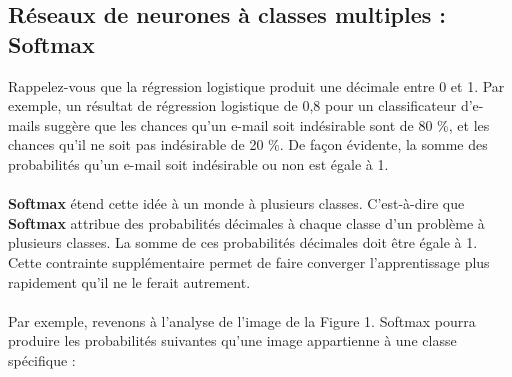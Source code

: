\documentclass[french]{article}
\begin{document}
\subsection{Réseaux de neurones à classes multiples : Softmax}
Rappelez-vous que la régression logistique produit une décimale entre 0 et 1. Par exemple, un résultat de régression logistique de 0,8 pour un classificateur d'e-mails suggère que les chances qu'un e-mail soit indésirable sont de 80 \%, et les chances qu'il ne soit pas indésirable de 20 \%. De façon évidente, la somme des probabilités qu'un e-mail soit indésirable ou non est égale à 1.\\\\
\textbf{Softmax} étend cette idée à un monde à plusieurs classes. C'est-à-dire que \textbf{Softmax} attribue des probabilités décimales à chaque classe d'un problème à plusieurs classes. La somme de ces probabilités décimales doit être égale à 1. Cette contrainte supplémentaire permet de faire converger l'apprentissage plus rapidement qu'il ne le ferait autrement.\\\\
Par exemple, revenons à l'analyse de l'image de la Figure 1. Softmax pourra produire les probabilités suivantes qu'une image appartienne à une classe spécifique :
\end{document}
